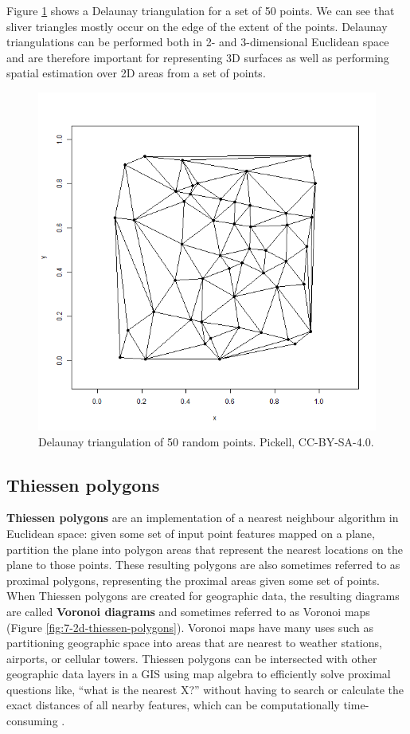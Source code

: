 \documentclass[
]{book}
\begin{document}
Figure \ref{fig:7-delaunay-triangulation} shows a Delaunay triangulation for a set of 50 points. We can see that sliver triangles mostly occur on the edge of the extent of the points. Delaunay triangulations can be performed both in 2- and 3-dimensional Euclidean space and are therefore important for representing 3D surfaces as well as performing spatial estimation over 2D areas from a set of points.

\begin{figure}
\includegraphics[width=0.75\linewidth]{images/07-delaunay-triangulation} \caption{Delaunay triangulation of 50 random points. Pickell, CC-BY-SA-4.0.}\label{fig:7-delaunay-triangulation}
\end{figure}

\hypertarget{thiessen-polygons}{%
\subsection{Thiessen polygons}\label{thiessen-polygons}}

\textbf{Thiessen polygons} are an implementation of a nearest neighbour algorithm in Euclidean space: given some set of input point features mapped on a plane, partition the plane into polygon areas that represent the nearest locations on the plane to those points. These resulting polygons are also sometimes referred to as proximal polygons, representing the proximal areas given some set of points. When Thiessen polygons are created for geographic data, the resulting diagrams are called \textbf{Voronoi diagrams} and sometimes referred to as Voronoi maps (Figure \ref{fig:7-2d-thiessen-polygons}). Voronoi maps have many uses such as partitioning geographic space into areas that are nearest to weather stations, airports, or cellular towers. Thiessen polygons can be intersected with other geographic data layers in a GIS using map algebra to efficiently solve proximal questions like, ``what is the nearest X?'' without having to search or calculate the exact distances of all nearby features, which can be computationally time-consuming \citep{okabe_nearest_1994}.
\end{document}
